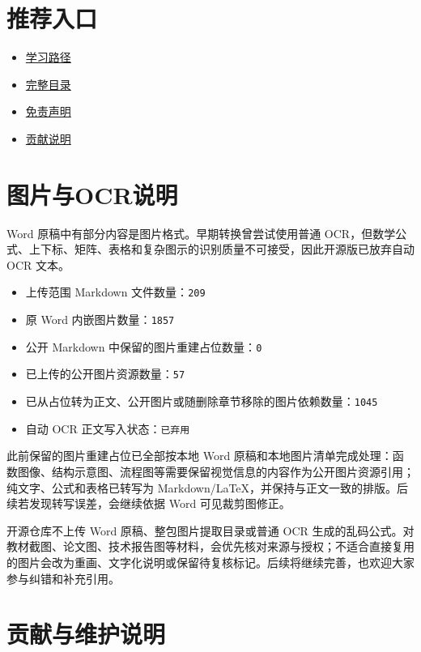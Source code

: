 \hypertarget{ux63a8ux8350ux5165ux53e3}{%
\section{推荐入口}\label{ux63a8ux8350ux5165ux53e3}}

\begin{itemize}
\tightlist
\item
  \href{学习路径.md}{学习路径}
\item
  \href{目录.md}{完整目录}
\item
  \href{DISCLAIMER.md}{免责声明}
\item
  \href{CONTRIBUTING.md}{贡献说明}
\end{itemize}

\hypertarget{ux56feux7247ux4e0eocrux8bf4ux660e}{%
\section{图片与OCR说明}\label{ux56feux7247ux4e0eocrux8bf4ux660e}}

Word 原稿中有部分内容是图片格式。早期转换曾尝试使用普通 OCR，但数学公式、上下标、矩阵、表格和复杂图示的识别质量不可接受，因此开源版已放弃自动 OCR 文本。

\begin{itemize}
\tightlist
\item
  上传范围 Markdown 文件数量：\texttt{209}
\item
  原 Word 内嵌图片数量：\texttt{1857}
\item
  公开 Markdown 中保留的图片重建占位数量：\texttt{0}
\item
  已上传的公开图片资源数量：\texttt{57}
\item
  已从占位转为正文、公开图片或随删除章节移除的图片依赖数量：\texttt{1045}
\item
  自动 OCR 正文写入状态：\texttt{已弃用}
\end{itemize}

此前保留的图片重建占位已全部按本地 Word 原稿和本地图片清单完成处理：函数图像、结构示意图、流程图等需要保留视觉信息的内容作为公开图片资源引用；纯文字、公式和表格已转写为 Markdown/LaTeX，并保持与正文一致的排版。后续若发现转写误差，会继续依据 Word 可见裁剪图修正。

开源仓库不上传 Word 原稿、整包图片提取目录或普通 OCR 生成的乱码公式。对教材截图、论文图、技术报告图等材料，会优先核对来源与授权；不适合直接复用的图片会改为重画、文字化说明或保留待复核标记。后续将继续完善，也欢迎大家参与纠错和补充引用。

\hypertarget{ux8d21ux732eux4e0eux7ef4ux62a4ux8bf4ux660e}{%
\section{贡献与维护说明}\label{ux8d21ux732eux4e0eux7ef4ux62a4ux8bf4ux660e}}

